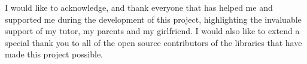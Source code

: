 \documentclass[12pt]{report} %
\begin{document}
\bigskip

I would like to acknowledge, and thank everyone that has helped me and supported me during the development of this project, highlighting the invaluable support of my tutor, my parents and my girlfriend.
I would also like to extend a special thank you to all of the open source contributors of the libraries that have made this project possible.

	\vfill



\newpage %
\thispagestyle{empty}
\mbox{}




    
    




\tableofcontents
\thispagestyle{fancy}



\newpage %
\thispagestyle{empty}
\mbox{}



\listoffigures
\thispagestyle{fancy}



\listoftables
\thispagestyle{fancy}
\end{document}
